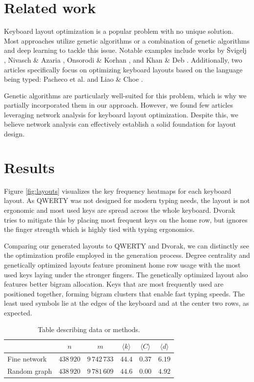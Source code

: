 \documentclass[9pt,twocolumn,twoside]{pnas-report}
\begin{document}
\section*{Related work}

Keyboard layout optimization is a popular problem with no unique solution.
Most approaches utilize genetic algorithms or a combination of genetic algorithms and deep learning to tackle this issue.
Notable examples include works by Švigelj \cite{svigelj2019}, Nivasch \& Azaria \cite{NiAz2021, NiAz2023}, Onsorodi \& Korhan \cite{onsorodi2020}, and Khan \& Deb \cite{KhDe2023}.
Additionally, two articles specifically focus on optimizing keyboard layouts based on the language being typed: Pacheco et al. \cite{eniac} and Liao \& Choe \cite{ChCh2013}.

Genetic algorithms are particularly well-suited for this problem, which is why we partially incorporated them in our approach.
However, we found few articles leveraging network analysis for keyboard layout optimization.
Despite this, we believe network analysis can effectively establish a solid foundation for layout design.

\section*{Results}

Figure \ref{fig:layouts} visualizes the key frequency heatmaps for each keyboard layout.
As QWERTY was not designed for modern typing needs, the layout is not ergonomic and most used keys are spread across the whole keyboard.
Dvorak tries to mitigate this by placing most frequent keys on the home row, but ignores the finger strength which is highly tied with typing ergonomics.

Comparing our generated layouts to QWERTY and Dvorak, we can distinctly see the optimization profile employed in the generation process.
Degree centrality and genetically optimized layouts feature prominent home row usage with the most used keys laying under the stronger fingers.
The genetically optimized layout also features better bigram allocation.
Keys that are most frequently used are positioned together, forming bigram clusters that enable fast typing speeds.
The least used symbols lie at the edges of the keyboard and at the center two rows, as expected.

\begin{table}[h]\centering%
	\caption{Table describing data or methods.}
	\begin{tabular}{lccccc}\toprule
	    & $n$ & $m$ & $\langle k\rangle$ & $\langle C\rangle$ & $\langle d\rangle$ \\\midrule
	    Fine network & $438\,920$ & $9\,742\,733$ & $44.4$ & $0.37$ & $6.19$ \\
	    Random graph & $438\,920$ & $9\,781\,609$ & $44.6$ & $0.00$ & $4.92$ \\\bottomrule
	\end{tabular}
	\label{tbl:example}
\end{table}
\end{document}
